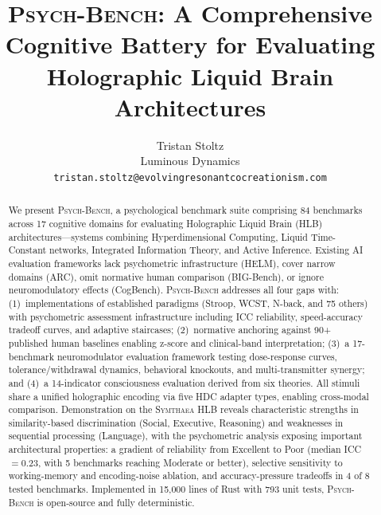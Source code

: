\documentclass[11pt,letterpaper]{article}
\newcommand{\symthaea}{\textsc{Symthaea}}
\newcommand{\psychbench}{\textsc{Psych-Bench}}
\newcommand{\hlb}{\textsc{HLB}}
\begin{document}
\title{\psychbench{}: A Comprehensive Cognitive Battery for Evaluating\\
Holographic Liquid Brain Architectures}

\author{Tristan Stoltz\\
Luminous Dynamics\\
\texttt{tristan.stoltz@evolvingresonantcocreationism.com}}

\date{}
\maketitle

\begin{abstract}
\noindent
We present \psychbench{}, a psychological benchmark suite comprising 84 benchmarks across 17 cognitive domains for evaluating Holographic Liquid Brain (\hlb{}) architectures---systems combining Hyperdimensional Computing, Liquid Time-Constant networks, Integrated Information Theory, and Active Inference. Existing AI evaluation frameworks lack psychometric infrastructure (HELM), cover narrow domains (ARC), omit normative human comparison (BIG-Bench), or ignore neuromodulatory effects (CogBench). \psychbench{} addresses all four gaps with: (1)~implementations of established paradigms (Stroop, WCST, N-back, and 75 others) with psychometric assessment infrastructure including ICC reliability, speed-accuracy tradeoff curves, and adaptive staircases; (2)~normative anchoring against 90+ published human baselines enabling z-score and clinical-band interpretation; (3)~a 17-benchmark neuromodulator evaluation framework testing dose-response curves, tolerance/withdrawal dynamics, behavioral knockouts, and multi-transmitter synergy; and (4)~a 14-indicator consciousness evaluation derived from six theories. All stimuli share a unified holographic encoding via five HDC adapter types, enabling cross-modal comparison. Demonstration on the \symthaea{} \hlb{} reveals characteristic strengths in similarity-based discrimination (Social, Executive, Reasoning) and weaknesses in sequential processing (Language), with the psychometric analysis exposing important architectural properties: a gradient of reliability from Excellent to Poor (median ICC $= 0.23$, with 5 benchmarks reaching Moderate or better), selective sensitivity to working-memory and encoding-noise ablation, and accuracy-pressure tradeoffs in 4 of 8 tested benchmarks. Implemented in 15,000 lines of Rust with 793 unit tests, \psychbench{} is open-source and fully deterministic.
\end{abstract}
\end{document}
